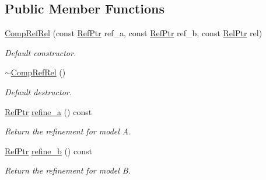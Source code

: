 \subsection*{Public Member Functions}
\begin{DoxyCompactItemize}
\item 
\mbox{\label{classilang_1_1_comp_ref_rel_add50e0ba6aadbb0e4ca7709731eff927}} 
\mbox{\hyperlink{classilang_1_1_comp_ref_rel_add50e0ba6aadbb0e4ca7709731eff927}{Comp\+Ref\+Rel}} (const \mbox{\hyperlink{namespaceilang_a540a114dcaa252083440129309151528}{Ref\+Ptr}} ref\+\_\+a, const \mbox{\hyperlink{namespaceilang_a540a114dcaa252083440129309151528}{Ref\+Ptr}} ref\+\_\+b, const \mbox{\hyperlink{namespaceilang_adca57fadf3c1f00dba124eb1ec56e6e9}{Rel\+Ptr}} rel)
\begin{DoxyCompactList}\small\item\em Default constructor. \end{DoxyCompactList}\item 
\mbox{\label{classilang_1_1_comp_ref_rel_afb969b73c83558223af4e37d5548e093}} 
\mbox{\hyperlink{classilang_1_1_comp_ref_rel_afb969b73c83558223af4e37d5548e093}{$\sim$\+Comp\+Ref\+Rel}} ()
\begin{DoxyCompactList}\small\item\em Default destructor. \end{DoxyCompactList}\item 
\mbox{\label{classilang_1_1_comp_ref_rel_a7efcf785a470099b69edbeb85f9aa911}} 
\mbox{\hyperlink{namespaceilang_a540a114dcaa252083440129309151528}{Ref\+Ptr}} \mbox{\hyperlink{classilang_1_1_comp_ref_rel_a7efcf785a470099b69edbeb85f9aa911}{refine\+\_\+a}} () const
\begin{DoxyCompactList}\small\item\em Return the refinement for model A. \end{DoxyCompactList}\item 
\mbox{\label{classilang_1_1_comp_ref_rel_ab0c5415a07ae07b247344fad20c142b2}} 
\mbox{\hyperlink{namespaceilang_a540a114dcaa252083440129309151528}{Ref\+Ptr}} \mbox{\hyperlink{classilang_1_1_comp_ref_rel_ab0c5415a07ae07b247344fad20c142b2}{refine\+\_\+b}} () const
\begin{DoxyCompactList}\small\item\em Return the refinement for model B. \end{DoxyCompactList}\item 

\end{DoxyCompactItemize}
